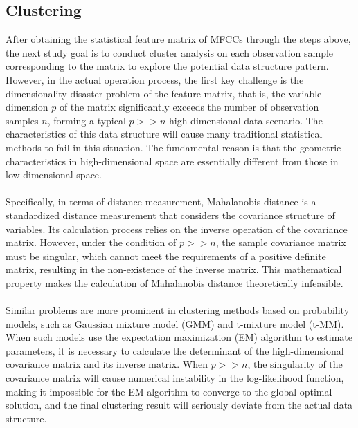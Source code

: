 \subsection{Clustering}\label{subsec:clustering}
After obtaining the statistical feature matrix of MFCCs through the steps above, the next study goal is to conduct cluster analysis on each observation sample corresponding to the matrix to explore the potential data structure pattern. However, in the actual operation process, the first key challenge is the dimensionality disaster problem of the feature matrix, that is, the variable dimension $p$ of the matrix significantly exceeds the number of observation samples $n$, forming a typical $p>>n$ high-dimensional data scenario. The characteristics of this data structure will cause many traditional statistical methods to fail in this situation. The fundamental reason is that the geometric characteristics in high-dimensional space are essentially different from those in low-dimensional space.\\
\\
Specifically, in terms of distance measurement, Mahalanobis distance is a standardized distance measurement that considers the covariance structure of variables. Its calculation process relies on the inverse operation of the covariance matrix. However, under the condition of $p>>n$, the sample covariance matrix must be singular, which cannot meet the requirements of a positive definite matrix, resulting in the non-existence of the inverse matrix. This mathematical property makes the calculation of Mahalanobis distance theoretically infeasible.\\
\\
Similar problems are more prominent in clustering methods based on probability models, such as Gaussian mixture model (GMM) and t-mixture model (t-MM). When such models use the expectation maximization (EM) algorithm to estimate parameters, it is necessary to calculate the determinant of the high-dimensional covariance matrix and its inverse matrix. When $p>>n$, the singularity of the covariance matrix will cause numerical instability in the log-likelihood function, making it impossible for the EM algorithm to converge to the global optimal solution, and the final clustering result will seriously deviate from the actual data structure.\\
\\
